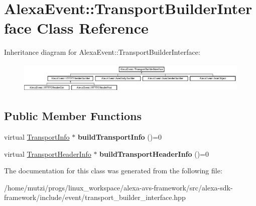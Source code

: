 \hypertarget{classAlexaEvent_1_1TransportBuilderInterface}{}\section{Alexa\+Event\+:\+:Transport\+Builder\+Interface Class Reference}
\label{classAlexaEvent_1_1TransportBuilderInterface}
Inheritance diagram for Alexa\+Event\+:\+:Transport\+Builder\+Interface\+:\begin{figure}[H]
\begin{center}
\leavevmode
\includegraphics[height=1.435897cm]{da/d66/classAlexaEvent_1_1TransportBuilderInterface}
\end{center}
\end{figure}
\subsection*{Public Member Functions}
\begin{DoxyCompactItemize}
\item 
\mbox{\label{classAlexaEvent_1_1TransportBuilderInterface_a88eae64a2593f4a8eae13a2a0cd0a81d}} 
virtual \hyperlink{classAlexaEvent_1_1TransportInfo}{Transport\+Info} $\ast$ {\bfseries build\+Transport\+Info} ()=0
\item 
\mbox{\label{classAlexaEvent_1_1TransportBuilderInterface_adc3107661d53e9be6ff182aa34d8634a}} 
virtual \hyperlink{classAlexaEvent_1_1TransportHeaderInfo}{Transport\+Header\+Info} $\ast$ {\bfseries build\+Transport\+Header\+Info} ()=0
\end{DoxyCompactItemize}


The documentation for this class was generated from the following file\+:\begin{DoxyCompactItemize}
\item 
/home/mutzi/progs/linux\+\_\+workspace/alexa-\/avs-\/framework/src/alexa-\/sdk-\/framework/include/event/transport\+\_\+builder\+\_\+interface.\+hpp\end{DoxyCompactItemize}
